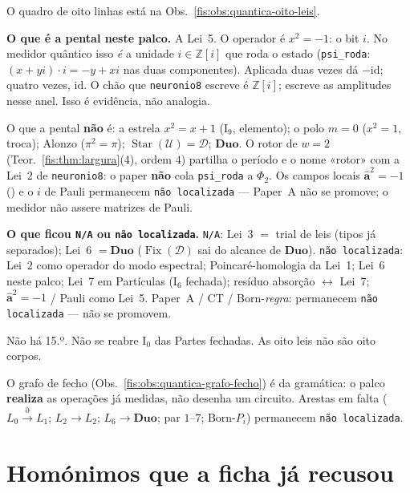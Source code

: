 \documentclass[livro.tex]{subfiles}
\begin{document}
O quadro de oito linhas está na
Obs.~\ref{fis:obs:quantica-oito-leis}.

\medskip\noindent\textbf{O que é a pental neste palco.}
A Lei~5. O operador é \(x^{2}=-1\): o bit \(i\).
No medidor quântico isso \emph{é}
a unidade \(i\in\mathbb{Z}[i]\) que roda o estado
(\texttt{psi\_roda}: \((x+yi)\cdot i=-y+xi\) nas duas
componentes). Aplicada duas vezes dá \(-\mathrm{id}\);
quatro vezes, \(\mathrm{id}\). O chão que
\texttt{neuronio8} escreve é \(\mathbb{Z}[i]\);
 escreve as amplitudes nesse anel.
Isso é evidência, não analogia.

O que a pental \textbf{não} é:
a estrela \(x^{2}=x+1\) (\(\mathrm{I}_{9}\), elemento);
o polo \(m=0\) (\(x^{2}=1\), troca);
Alonzo (\(\pi^{2}=\pi\));
\(\operatorname{Star}(\mathcal{U})=\mathcal{D}\);
\(\mathbf{Duo}\).
O rotor de \(w=2\)
(Teor.~\ref{fis:thm:largura}(4), ordem \(4\))
partilha o período e o nome «rotor» com a Lei~2
de \texttt{neuronio8}: o paper \textbf{não} cola
\texttt{psi\_roda} a \(\Phi_{2}\).
Os campos locais \(\hat{\mathbf{a}}^{2}=-1\)
() e o \(i\) de Pauli
permanecem \texttt{não localizada} --- Paper~A
não se promove; o medidor não assere matrizes
de Pauli.

\medskip\noindent\textbf{O que ficou \texttt{N/A} ou
\texttt{não localizada}.}
\texttt{N/A}: Lei~3 \(=\) trial de leis
(tipos já separados);
Lei~6 \(=\mathbf{Duo}\)
(\(\operatorname{Fix}(\mathcal{D})\) sai do alcance
de \(\mathbf{Duo}\)).
\texttt{não localizada}: Lei~2 como operador do
modo espectral; Poincaré-homologia da Lei~1;
Lei~6 neste palco; Lei~7 em Partículas
(\(\mathrm{I}_{6}\) fechada); resíduo
absorção \(\leftrightarrow\) Lei~7;
\(\hat{\mathbf{a}}^{2}=-1\) / Pauli como Lei~5.
Paper~A / CT / Born-\emph{regra}:
permanecem \texttt{não localizada}
--- não se promovem.

Não há 15.º. Não se reabre \(\mathrm{I}_{0}\)
das Partes fechadas. As oito leis não são
oito corpos.

O grafo de fecho
(Obs.~\ref{fis:obs:quantica-grafo-fecho})
é da gramática: o palco \textbf{realiza}
as operações já medidas, não desenha um
circuito. Arestas em falta
(\(L_0\xrightarrow{\partial}L_1\);
\(L_2\to L_2\); \(L_6\to\mathbf{Duo}\);
par \(1\)--\(7\); Born-\(P_i\))
permanecem \texttt{não localizada}.

\section{Homónimos que a ficha já recusou}\label{fis:quantica-homonimos}
\end{document}
